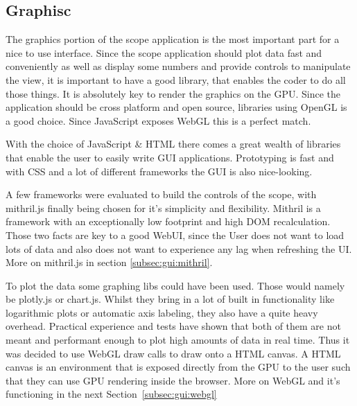 %
%

\subsection{Graphisc} %
\label{subsec:gui:graphics}

The graphics portion of the scope application is the most important part for a
nice to use  interface. Since the scope application should plot  data fast and
conveniently  as  well  as  display  some  numbers  and  provide  controls  to
manipulate the view, it is important to  have a good library, that enables the
coder to do all  those things. It is absolutely key to  render the graphics on
the  GPU. Since the  application should  be  cross platform  and open  source,
libraries using OpenGL  is a good choice. Since JavaScript  exposes WebGL this
is a perfect match.

With the choice of JavaScript \& HTML  there comes a great wealth of libraries
that enable the user to easily write GUI applications. Prototyping is fast and
with CSS and a lot of different frameworks the GUI is also nice-looking.

A  few frameworks  were evaluated  to build  the controls  of the  scope, with
mithril.js finally  being chosen for it's  simplicity and flexibility. Mithril
is a framework with an exceptionally low footprint and high DOM recalculation.
Those two facts are key to a good  WebUI, since the User does not want to load
lots of data and also does not  want to experience any lag when refreshing the
UI.
More on mithril.js in section \ref{subsec:gui:mithril}.

To plot the  data some graphing libs could have  been used. Those would namely
be plotly.js or chart.js. Whilst they bring in a lot of built in functionality
like logarithmic  plots or  automatic axis  labeling, they  also have  a quite
heavy overhead.
Practical experience and tests have shown that  both of them are not meant and
performant enough to plot high amounts of data in real time.
Thus it was decided to use WebGL draw calls to draw onto a HTML canvas. A HTML
canvas is  an environment that  is exposed directly from  the GPU to  the user
such that they can use GPU rendering inside the browser.
More on WebGL and it's functioning in the next Section~\ref{subsec:gui:webgl}

